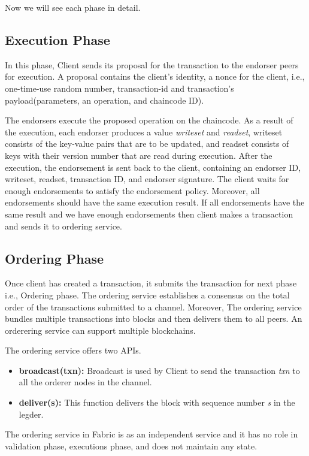 Now we will see each phase in detail.

\subsection{Execution Phase}
\label{ssec:exec}
In this phase, Client sends its proposal for the transaction to the endorser peers for execution. A proposal contains the client's identity, a nonce for the client, i.e., one-time-use random number, transaction-id and transaction's payload(parameters, an operation, and chaincode ID).

 The endorsers execute the proposed operation on the chaincode. As a result of the execution, each endorser produces a value \textit{writeset} and \textit{readset}, writeset consists of the key-value pairs that are to be updated, and readset consists of keys with their version number that are read during execution. After the execution, the endorsement is sent back to the client, containing an endorser ID, writeset, readset, transaction ID, and endorser signature. The client waits for enough endorsements to satisfy the endorsement policy. Moreover, all endorsements should have the same execution result. If all endorsements have the same result and we have enough endorsements then client makes a transaction and sends it to ordering service.
\subsection{Ordering Phase}
Once client has created a transaction, it submits the transaction for next phase i.e., Ordering phase.
    The ordering service establishes a consensus on the total order of the transactions submitted to a channel. Moreover, The ordering service bundles multiple transactions into blocks and then delivers them to all peers. An orderering service can support multiple blockchains.

The ordering service offers two APIs. 
\begin{itemize}
    \item \textbf{broadcast(txn):} Broadcast is used by Client to send the transaction \textit{txn}  to all the orderer nodes in the channel.
    \item \textbf{deliver(s):} This function delivers the block with sequence number \textit{s} in the legder.
    
\end{itemize}

The ordering service in Fabric is as an independent service and it has no role in validation phase, executions phase, and does not maintain any state.
